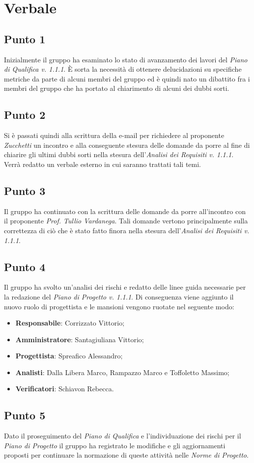 \section{Verbale}
    \subsection{Punto 1}
        Inizialmente il gruppo ha esaminato lo stato di avanzamento dei lavori del \textit{Piano di Qualifica v. 1.1.1}. È sorta la necessità di ottenere delucidazioni su specifiche metriche da parte di alcuni membri del gruppo ed è quindi nato un dibattito fra i membri del gruppo che ha portato al chiarimento di alcuni dei dubbi sorti.
    \subsection{Punto 2}
        Si è passati quindi alla scrittura della e-mail per richiedere al proponente \textit{Zucchetti} un incontro e alla conseguente stesura delle domande da porre al fine di chiarire gli ultimi dubbi sorti nella stesura dell'\textit{Analisi dei Requisiti v. 1.1.1}. Verrà redatto un verbale esterno in cui saranno trattati tali temi.
    \subsection{Punto 3}
        Il gruppo ha continuato con la scrittura delle domande da porre all'incontro con il proponente \textit{Prof. Tullio Vardanega}. Tali domande vertono principalmente sulla correttezza di ciò che è stato fatto finora nella stesura dell'\textit{Analisi dei Requisiti v. 1.1.1}.
    \subsection{Punto 4}
     	Il gruppo ha svolto un'analisi dei rischi e redatto delle linee guida necessarie per la redazione del \textit{Piano di Progetto v. 1.1.1}. 
        Di conseguenza viene aggiunto il nuovo ruolo di progettista e le mansioni vengono ruotate nel seguente modo:
        \begin{itemize}
            \item \textbf{Responsabile}: Corrizzato Vittorio;
            \item \textbf{Amministratore}: Santagiuliana Vittorio;
            \item \textbf{Progettista}: Spreafico Alessandro;
            \item \textbf{Analisti}: Dalla Libera Marco, Rampazzo Marco e Toffoletto Massimo;
            \item \textbf{Verificatori}: Schiavon Rebecca. 
        \end{itemize}
    \subsection{Punto 5}
        Dato il proseguimento del \textit{Piano di Qualifica} e l'individuazione dei rischi per il \textit{Piano di Progetto} il gruppo ha registrato le modifiche e gli aggiornamenti proposti per continuare la normazione di queste attività nelle \textit{Norme di Progetto}.
    